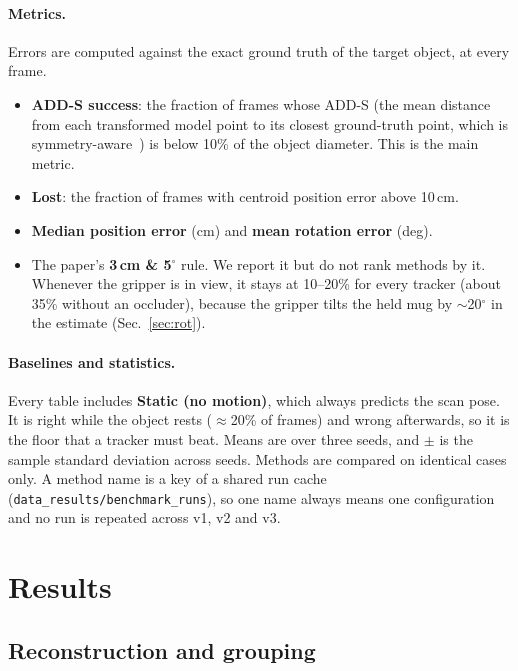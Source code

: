 \documentclass[10pt,a4paper]{article}
\begin{document}
\paragraph{Metrics.} Errors are computed against the exact ground truth of the
target object, at every frame.
\begin{itemize}
  \item \textbf{ADD-S success}: the fraction of frames whose ADD-S (the mean
        distance from each transformed model point to its closest ground-truth
        point, which is symmetry-aware~\cite{posecnn}) is below 10\% of the object
        diameter. This is the main metric.
  \item \textbf{Lost}: the fraction of frames with centroid position error above 10\,cm.
  \item \textbf{Median position error} (cm) and \textbf{mean rotation error} (deg).
  \item The paper's \textbf{3\,cm \& 5$^\circ$} rule. We report it but do not rank
        methods by it. Whenever the gripper is in view, it stays at 10--20\% for every
        tracker (about 35\% without an occluder), because the gripper tilts the
        held mug by $\sim$20$^\circ$ in the estimate (Sec.~\ref{sec:rot}).
\end{itemize}

\paragraph{Baselines and statistics.} Every table includes \textbf{Static (no
motion)}, which always predicts the scan pose. It is right while the object
rests ($\approx$20\% of frames) and wrong afterwards, so it is the floor that a
tracker must beat. Means are over three seeds, and $\pm$ is the sample standard
deviation across seeds. Methods are compared on identical cases only. A method
name is a key of a shared run cache (\texttt{data\_results/benchmark\_runs}), so
one name always means one configuration and no run is repeated across v1, v2 and v3.

\section{Results}
\label{sec:results}

\subsection{Reconstruction and grouping}
\end{document}
